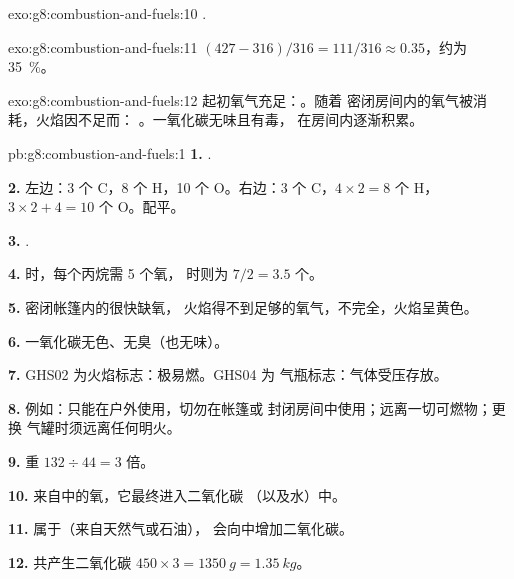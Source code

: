 \begin{solution}{exo:g8:combustion-and-fuels:10}
.
\end{solution}

\begin{solution}{exo:g8:combustion-and-fuels:11}
$(427 - 316)/316 = 111/316 \approx 0.35$，约为 \qty{35}{\percent}。
\end{solution}

\begin{solution}{exo:g8:combustion-and-fuels:12}
起初氧气充足：。随着
密闭房间内的氧气被消耗，火焰因不足而：
。一氧化碳无味且有毒，
在房间内逐渐积累。
\end{solution}

\begin{solution}{pb:g8:combustion-and-fuels:1}
\textbf{1.} .

\textbf{2.} 左边：3 个 C，8 个 H，10 个 O。右边：3 个 C，$4 \times 2 = 8$ 个 H，
$3 \times 2 + 4 = 10$ 个 O。配平。

\textbf{3.} .

\textbf{4.} 时，每个丙烷需 5 个氧，
时则为 $7/2 = 3.5$ 个。

\textbf{5.} 密闭帐篷内的很快缺氧，
火焰得不到足够的氧气，不完全，火焰呈黄色。

\textbf{6.} 一氧化碳无色、无臭（也无味）。

\textbf{7.} GHS02 为火焰标志：极易燃。GHS04 为
气瓶标志：气体受压存放。

\textbf{8.} 例如：只能在户外使用，切勿在帐篷或
封闭房间中使用；远离一切可燃物；更换
气罐时须远离任何明火。

\textbf{9.} 重 $132 \div 44 = 3$ 倍。

\textbf{10.} 来自中的氧，它最终进入二氧化碳
（以及水）中。

\textbf{11.} 属于（来自天然气或石油），
会向中增加二氧化碳。

\textbf{12.} 共产生二氧化碳
$450 \times 3 = \qty{1350}{g} = \qty{1.35}{kg}$。
\end{solution}
